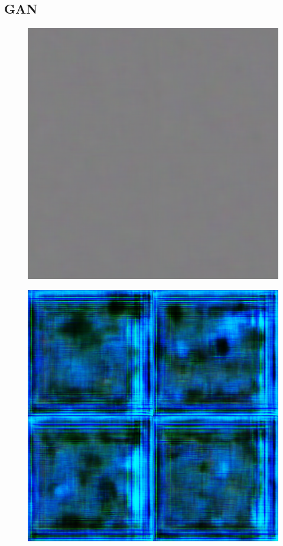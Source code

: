 \subsection{GAN}

\begin{figure}[H]
	\centering
	
	\begin{minipage}{0.24\columnwidth}
		\centering
		\includegraphics[clip, width=\linewidth]{fig/generative_adversarial_nets/0000_0000}
		\label{fig:}
	\end{minipage}
	\begin{minipage}{0.24\columnwidth}
		\centering
		\includegraphics[clip, width=\linewidth]{fig/generative_adversarial_nets/0079_0000}

\end{minipage}
\end{figure}
